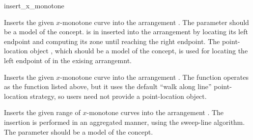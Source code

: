
\begin{ccRefFunction}{insert_x_monotone}


   {Inserts the given $x$-monotone curve  into the arrangement
    . The  parameter should be a model of the
     concept.  is in inserted
    into the arrangement by locating its left endpoint and computing its
    zone until reaching the right endpoint.
    The point-location object , which should be a model of the
     concept, is used for locating the
    left endpoint of  in the exising arrangemnt.
    }

   {Inserts the given $x$-monotone curve  into the arrangement
    . The function operates as the function listed above, but it
    uses the default ``walk along line'' point-location strategy, so users
    need not provide a point-location object.}

   {Inserts the given range of $x$-monotone curves \ccc{[first,last)}
    into the arrangement . The insertion is performed in an aggregated
    manner, using the sweep-line algorithm. The  parameter should
    be a model of the  concept.
    }

\end{ccRefFunction}
